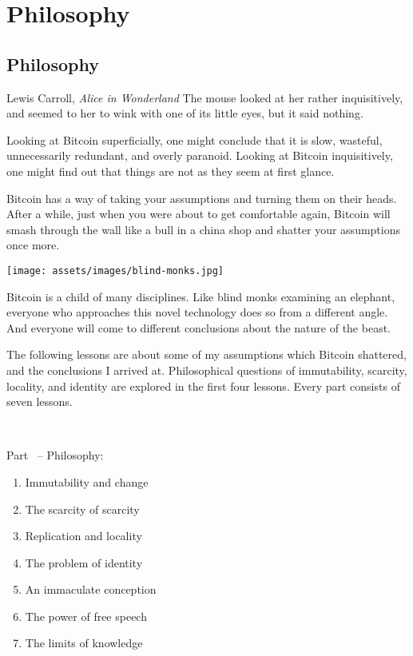 \part{Philosophy}
\label{ch:philosophy}
\chapter*{Philosophy}

\begin{chapquote}{Lewis Carroll, \textit{Alice in Wonderland}}
The mouse looked at her rather inquisitively, and seemed to her to wink with one
of its little eyes, but it said nothing.
\end{chapquote}

Looking at Bitcoin superficially, one might conclude that it is slow, wasteful,
unnecessarily redundant, and overly paranoid. Looking at Bitcoin inquisitively,
one might find out that things are not as they seem at first glance.

Bitcoin has a way of taking your assumptions and turning them on their heads.
After a while, just when you were about to get comfortable again, Bitcoin will
smash through the wall like a bull in a china shop and shatter your assumptions
once more.

\begin{center}
  \texttt{[image: assets/images/blind-monks.jpg]}
  \label{fig:blind-monks}
\end{center}

Bitcoin is a child of many disciplines. Like blind monks examining an elephant,
everyone who approaches this novel technology does so from a different angle.
And everyone will come to different conclusions about the nature of the beast.

The following lessons are about some of my assumptions which Bitcoin shattered,
and the conclusions I arrived at. Philosophical questions of immutability,
scarcity, locality, and identity are explored in the first four lessons.  Every
part consists of seven lessons.

~

\begin{samepage}
Part~\ref{ch:philosophy} -- Philosophy:

\begin{enumerate}
  \item Immutability and change
  \item The scarcity of scarcity
  \item Replication and locality
  \item The problem of identity
  \item An immaculate conception
  \item The power of free speech
  \item The limits of knowledge
\end{enumerate}
\end{samepage}

